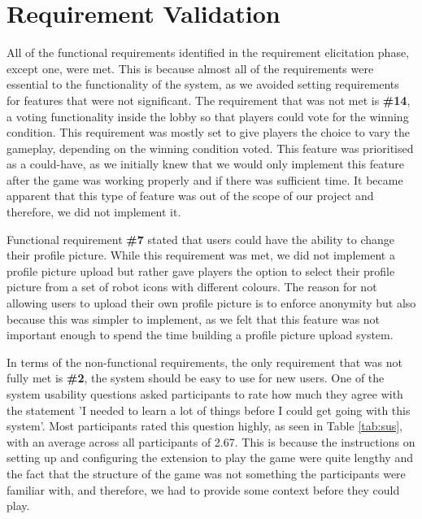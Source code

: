 \documentclass{l4proj}
\begin{document}
\section{Requirement Validation}
All of the functional requirements identified in the requirement elicitation phase, except one, were met. This is because almost all of the requirements were essential to the functionality of the system, as we avoided setting requirements for features that were not significant. The requirement that was not met is \textbf{\#14}, a voting functionality inside the lobby so that players could vote for the winning condition. This requirement was mostly set to give players the choice to vary the gameplay, depending on the winning condition voted. This feature was prioritised as a could-have, as we initially knew that we would only implement this feature after the game was working properly and if there was sufficient time. It became apparent that this type of feature was out of the scope of our project and therefore, we did not implement it. 

Functional requirement \textbf{\#7} stated that users could have the ability to change their profile picture. While this requirement was met, we did not implement a profile picture upload but rather gave players the option to select their profile picture from a set of robot icons with different colours. The reason for not allowing users to upload their own profile picture is to enforce anonymity but also because this was simpler to implement, as we felt that this feature was not important enough to spend the time building a profile picture upload system.

In terms of the non-functional requirements, the only requirement that was not fully met is \textbf{\#2}, the system should be easy to use for new users. One of the system usability questions asked participants to rate how much they agree with the statement 'I needed to learn a lot of things before I could get going with this system'. Most participants rated this question highly, as seen in Table \ref{tab:sus}, with an average across all participants of 2.67. This is because the instructions on setting up and configuring the extension to play the game were quite lengthy and the fact that the structure of the game was not something the participants were familiar with, and therefore, we had to provide some context before they could play.  


\end{document}
